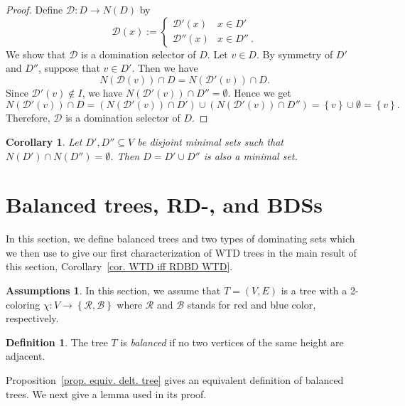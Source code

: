 \documentclass[12pt, reqno]{amsart}
\theoremstyle{definition}
\newtheorem*{assumptions}{Assumptions}
\theoremstyle{plain}
\newtheorem{corollary}[theorem]{Corollary}
\theoremstyle{definition}
\newtheorem{definition}[theorem]{Definition}
\newcommand{\R}{\mathcal{R}}
\newcommand{\B}{\mathcal{B}}
\newcommand\set[1]{\left\lbrace #1 \right\rbrace}
\begin{document}
\begin{proof}
    Define $\mathcal{D}:D \to N(D)$ by
    $$
    \mathcal{D}(x) := \begin{cases}
        \mathcal{D}'(x) & x \in D'\\
        \mathcal{D}''(x) & x \in D''\ .
    \end{cases}
    $$
    We show that $\mathcal{D}$ is a domination selector of $D$.
    Let $v \in D$.
    By symmetry of $D'$ and $D''$, suppose that $v \in D'$.
    Then we have
    $$
    N(\mathcal{D}(v)) \cap D = N(\mathcal{D}'(v)) \cap D.
    $$
    Since $\mathcal{D}'(v) \not\in I$, we have $N(\mathcal{D}'(v)) \cap D'' = \emptyset$.
    Hence we get
    $$
    N(\mathcal{D}'(v)) \cap D = (N(\mathcal{D}'(v)) \cap D') \cup (N(\mathcal{D}'(v)) \cap D'') = \set{v} \cup \emptyset = \set{v}.
    $$
    Therefore, $\mathcal{D}$ is a domination selector of $D$.
\end{proof}

\begin{corollary}\label{cor. neighbor disjoint min. sets  -> union is min.}    
    Let $D', D'' \subseteq V$ be disjoint minimal sets such that $N(D') \cap N(D'') = \emptyset$.
    Then $D = D' \cup D''$ is also a minimal set.
\end{corollary}


\section{Balanced trees, RD-, and BDSs}\label{sec. Balanced trees}

In this section, we define balanced trees and two types of dominating sets which we then use to give our first characterization of WTD trees in the main result of this section, Corollary~\ref{cor. WTD iff RDBD WTD}. 

\begin{assumptions}
In this section, we assume that $T = (V,E)$ is a tree with a 2-coloring $\chi: V \to \set{\R,\B}$ where $\R$ and $\B$ stands for red and blue color, respectively.
\end{assumptions}

\begin{definition}\label{def. delt. tree}
    The tree $T$ is \emph{balanced} if no two vertices of the same height are adjacent.
\end{definition}

Proposition~\ref{prop. equiv. delt. tree} gives an equivalent definition of balanced trees.
We next give a lemma used in its proof.
\end{document}
